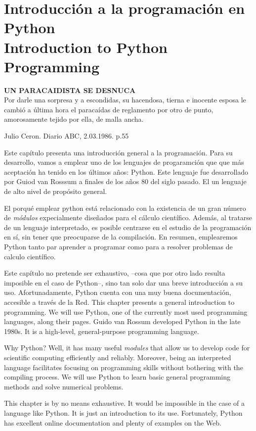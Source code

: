 \chapter{Introducción a la programación en Python\\ Introduction to Python Programming}\label{ch:intpr}  
\epigraph{\textbf{UN PARACAIDISTA SE DESNUCA}\\ Por darle una sorpresa y a escondidas, su hacendosa, tierna e inocente esposa le cambió a última hora el paracaídas de reglamento por otro de punto, amorosamente tejido por ella, de malla ancha.}{Julio Ceron. Diario ABC, 2.03.1986. p.55}
\begin{paracol}{2}
Este capítulo presenta una introducción general a la programación. Para su desarrollo, vamos a emplear uno de los lenguajes de progaramción que  que más aceptación ha tenido en los últimos años: Python. Este lenguaje fue desarrollado por Guiod van Rosssum a finales de los años 80 del siglo pasado. El un lenguaje de alto nivel de propósito general.

El porqué emplear python está relacionado con la existencia de un gran número de \emph{módulos} expecialmente diseñados para el cálculo científico. Además, al tratarse de un lenguaje interpretado, es posible centrarse en el estudio de la programación en sí, sin tener que preocuparse de la compilación. En resumen, emplearemos Python tanto par aprender a programar como para a resolver problemas de calculo científico.

Este capítulo no pretende ser exhaustivo, --cosa que por otro lado resulta imposible en el caso de Python--, sino tan solo dar una breve introducción a su uso. Afortunadamente, Python cuenta con una muy buena documentación, accesible a través de la Red. 
\switchcolumn 
This chapter presents a general introduction to programming. We will use Python, one of the currently most used programming languages, along their pages. Guido van Rossum developed Python in the late 1980s. It is a high-level, general-purpose programming language. 

Why Python? Well, it has many useful \emph{modules} that allow us to develop code for scientific computing efficiently and reliably. Moreover, being an interpreted language facilitates focusing on programming skills without bothering with the compiling process. We will use Python to learn basic general programming methods and solve numerical problems.

This chapter is by no means exhaustive. It would be impossible in the case of a language like Python. It is just an introduction to its use. Fortunately, Python has excellent online documentation and plenty of examples on the Web. 
\end{paracol}


